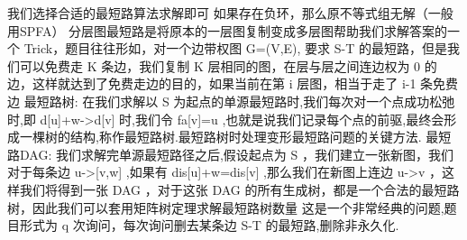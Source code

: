 {}我们选择合适的最短路算法求解即可 如果存在负环，那么原不等式组无解（一般用SPFA）\markdownRendererInterblockSeparator
{}
\markdownRendererSectionEnd \markdownRendererSectionBegin
{}\markdownRendererInterblockSeparator
{}分层图最短路是将原本的一层图复制变成多层图帮助我们求解答案的一个 \markdownRendererDollarSign{}Trick\markdownRendererDollarSign{}，题目往往形如，对一个边带权图 \markdownRendererDollarSign{}G=(V,E)\markdownRendererDollarSign{}, 要求 \markdownRendererDollarSign{}S-T\markdownRendererDollarSign{} 的最短路，但是我们可以免费走 \markdownRendererDollarSign{}K\markdownRendererDollarSign{} 条边，我们复制 \markdownRendererDollarSign{}K\markdownRendererDollarSign{} 层相同的图，在层与层之间连边权为 \markdownRendererDollarSign{}0\markdownRendererDollarSign{} 的边，这样就达到了免费走边的目的，如果当前在第 \markdownRendererDollarSign{}i\markdownRendererDollarSign{} 层图，相当于走了 \markdownRendererDollarSign{}i-1\markdownRendererDollarSign{} 条免费边\markdownRendererInterblockSeparator
{}
\markdownRendererSectionEnd \markdownRendererSectionBegin
{}\markdownRendererInterblockSeparator
{}最短路树:\markdownRendererParagraphSeparator
{}在我们求解以\markdownRendererDollarSign{} S \markdownRendererDollarSign{}为起点的单源最短路时,我们每次对一个点成功松弛时,即\markdownRendererDollarSign{} d[u]+w->d[v] \markdownRendererDollarSign{}时,我们令\markdownRendererDollarSign{} fa[v]=u \markdownRendererDollarSign{},也就是说我们记录每个点的前驱,最终会形成一棵树的结构,称作最短路树.最短路树时处理变形最短路问题的关键方法.\markdownRendererParagraphSeparator
{}最短路DAG:\markdownRendererParagraphSeparator
{}我们求解完单源最短路径之后,假设起点为\markdownRendererDollarSign{} S \markdownRendererDollarSign{}，我们建立一张新图，我们对于每条边\markdownRendererDollarSign{} u->[v,w] \markdownRendererDollarSign{},如果有\markdownRendererDollarSign{} dis[u]+w=dis[v] \markdownRendererDollarSign{},那么我们在新图上连边\markdownRendererDollarSign{} u->v \markdownRendererDollarSign{}，这样我们将得到一张\markdownRendererDollarSign{} DAG \markdownRendererDollarSign{}，对于这张\markdownRendererDollarSign{} DAG \markdownRendererDollarSign{}的所有生成树，都是一个合法的最短路树，因此我们可以套用矩阵树定理求解最短路树数量\markdownRendererInterblockSeparator
{}
\markdownRendererSectionEnd \markdownRendererSectionBegin
{}\markdownRendererInterblockSeparator
{}这是一个非常经典的问题,题目形式为\markdownRendererDollarSign{} q \markdownRendererDollarSign{}次询问，每次询问删去某条边\markdownRendererDollarSign{} S-T \markdownRendererDollarSign{}的最短路,删除非永久化.\markdownRendererParagraphSeparator
